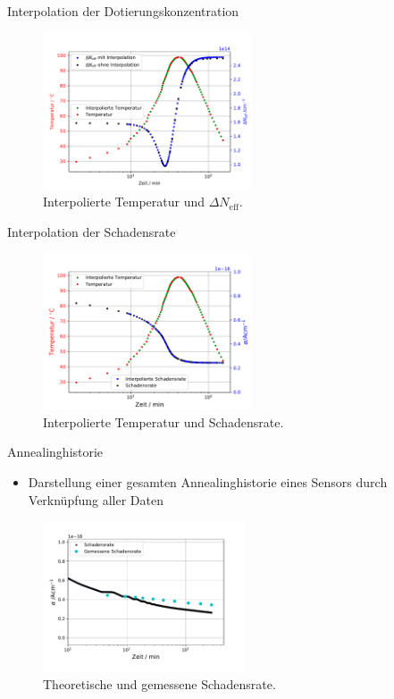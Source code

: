 \documentclass[aspectratio=1610, 9pt]{beamer}
\begin{document}
\begin{frame}{Interpolation der Dotierungskonzentration}
  \begin{figure}
      \includegraphics[width=0.55\textwidth]{images/interpolationtdata.PDF}
  \caption{Interpolierte Temperatur und $\Delta N_{\mathrm{eff}}$.}
  \end{figure}
\end{frame}


\begin{frame}{Interpolation der Schadensrate}
  \begin{figure}
      \includegraphics[width=0.55\textwidth]{images/damage_interpolation.PDF}
  \caption{Interpolierte Temperatur und Schadensrate.}
  \end{figure}
\end{frame}

\begin{frame}{Annealinghistorie}
  \begin{itemize}
    \item Darstellung einer gesamten Annealinghistorie eines Sensors durch Verknüpfung aller Daten
  \end{itemize}

  \begin{figure}
      \includegraphics[width=0.53\textwidth]{images/damage_P_3.PDF}
  \caption{Theoretische und gemessene Schadensrate.}
  \end{figure}
\end{frame}
\end{document}
